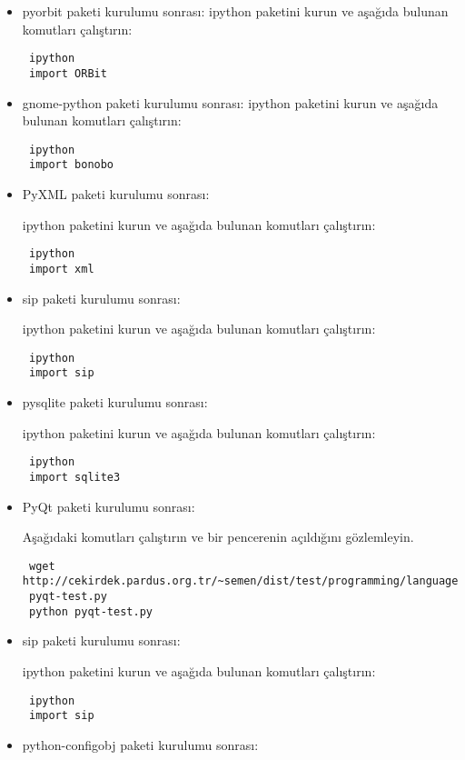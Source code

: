 \documentclass[a4paper,10pt]{article}
\begin{document}
\begin{itemize}
\item pyorbit paketi kurulumu sonrası:
ipython paketini kurun ve aşağıda bulunan komutları çalıştırın:
\begin{verbatim}
 ipython
 import ORBit
\end{verbatim}

\item gnome-python paketi kurulumu sonrası:
ipython paketini kurun ve aşağıda bulunan komutları çalıştırın:
\begin{verbatim}
 ipython
 import bonobo
\end{verbatim}


\item PyXML paketi kurulumu sonrası:

ipython paketini kurun ve aşağıda bulunan komutları çalıştırın:
\begin{verbatim}
 ipython
 import xml
\end{verbatim}

\item sip paketi kurulumu sonrası:

ipython paketini kurun ve aşağıda bulunan komutları çalıştırın:
\begin{verbatim}
 ipython
 import sip
\end{verbatim}
\item pysqlite paketi kurulumu sonrası:

ipython paketini kurun ve aşağıda bulunan komutları çalıştırın:
\begin{verbatim}
 ipython
 import sqlite3
\end{verbatim}


\item PyQt paketi kurulumu sonrası:

Aşağıdaki komutları çalıştırın ve bir pencerenin açıldığını gözlemleyin.
\begin{verbatim}
 wget http://cekirdek.pardus.org.tr/~semen/dist/test/programming/language/python/
 pyqt-test.py
 python pyqt-test.py
\end{verbatim}


\item sip paketi kurulumu sonrası:

ipython paketini kurun ve aşağıda bulunan komutları çalıştırın:
\begin{verbatim}
 ipython
 import sip
\end{verbatim}

\item python-configobj paketi kurulumu sonrası:


\end{itemize}
\end{document}
